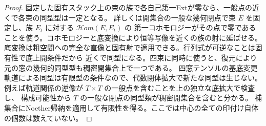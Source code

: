 \begin{proof}
固定した固有スタック上の束の族で各自己第一Extが零なら、一般点の近くで各束の同型型は一定となる。
詳しくは開集合の一般な幾何閉点で束 $E$ を固定し、族 $E_t$ に対する $\mathcal Hom(E,E_t)$ の
第一コホモロジーがその点で零であることを使う。コホモロジーと底変換により恒等写像を近くの族の射に延ばせる。
底変換は粗空間への完全な直像と固有射で適用できる。行列式が可逆なことは固有性で底上開条件だから
近くで同型になる。四束に同時に使うと、復元により元の窓の幾何的同型型も稠密開集合上で一つである。
四窓テンソルの基底変更軌道による同型は有限型の条件なので、代数閉体拡大で新たな同型は生じない。
例えば軌道関係の逆像が $T\times T$ の一般点を含むことを上の独立な底拡大で検査し、
構成可能性から $T$ の一般な閉点の同型類が稠密開集合を含むと分かる。
補集合にNoether帰納を適用して有限性を得る。ここでは中心の全ての印付け自体の個数は数えていない。
\end{proof}
